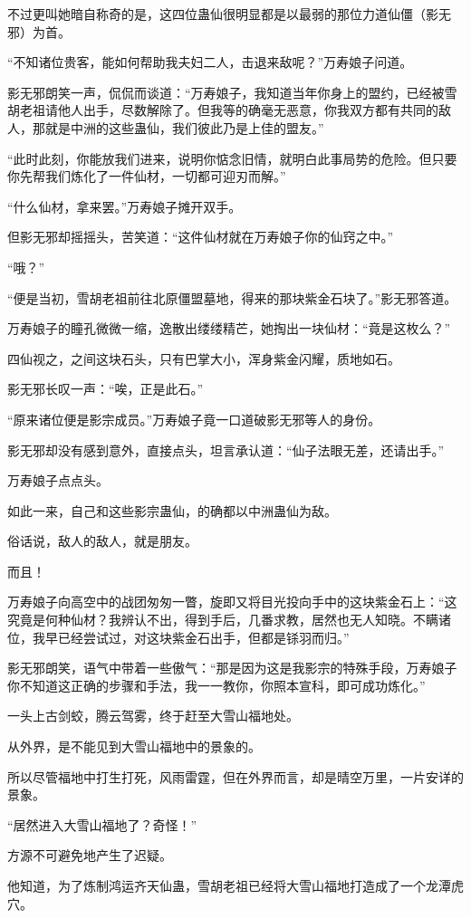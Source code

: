\begin{this_body}
不过更叫她暗自称奇的是，这四位蛊仙很明显都是以最弱的那位力道仙僵（影无邪）为首。

“不知诸位贵客，能如何帮助我夫妇二人，击退来敌呢？”万寿娘子问道。

影无邪朗笑一声，侃侃而谈道：“万寿娘子，我知道当年你身上的盟约，已经被雪胡老祖请他人出手，尽数解除了。但我等的确毫无恶意，你我双方都有共同的敌人，那就是中洲的这些蛊仙，我们彼此乃是上佳的盟友。”

“此时此刻，你能放我们进来，说明你惦念旧情，就明白此事局势的危险。但只要你先帮我们炼化了一件仙材，一切都可迎刃而解。”

“什么仙材，拿来罢。”万寿娘子摊开双手。

但影无邪却摇摇头，苦笑道：“这件仙材就在万寿娘子你的仙窍之中。”

“哦？”

“便是当初，雪胡老祖前往北原僵盟墓地，得来的那块紫金石块了。”影无邪答道。

万寿娘子的瞳孔微微一缩，逸散出缕缕精芒，她掏出一块仙材：“竟是这枚么？”

四仙视之，之间这块石头，只有巴掌大小，浑身紫金闪耀，质地如石。

影无邪长叹一声：“唉，正是此石。”

“原来诸位便是影宗成员。”万寿娘子竟一口道破影无邪等人的身份。

影无邪却没有感到意外，直接点头，坦言承认道：“仙子法眼无差，还请出手。”

万寿娘子点点头。

如此一来，自己和这些影宗蛊仙，的确都以中洲蛊仙为敌。

俗话说，敌人的敌人，就是朋友。

而且！

万寿娘子向高空中的战团匆匆一瞥，旋即又将目光投向手中的这块紫金石上：“这究竟是何种仙材？我辨认不出，得到手后，几番求教，居然也无人知晓。不瞒诸位，我早已经尝试过，对这块紫金石出手，但都是铩羽而归。”

影无邪朗笑，语气中带着一些傲气：“那是因为这是我影宗的特殊手段，万寿娘子你不知道这正确的步骤和手法，我一一教你，你照本宣科，即可成功炼化。”

一头上古剑蛟，腾云驾雾，终于赶至大雪山福地处。

从外界，是不能见到大雪山福地中的景象的。

所以尽管福地中打生打死，风雨雷霆，但在外界而言，却是晴空万里，一片安详的景象。

“居然进入大雪山福地了？奇怪！”

方源不可避免地产生了迟疑。

他知道，为了炼制鸿运齐天仙蛊，雪胡老祖已经将大雪山福地打造成了一个龙潭虎穴。


\end{this_body}
